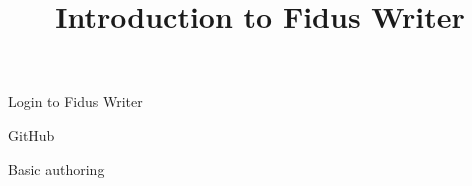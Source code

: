 \documentclass{article}
\begin{document}
\title{Introduction to Fidus Writer}

\maketitle


Login to Fidus Writer


GitHub


Basic authoring
\end{document}

